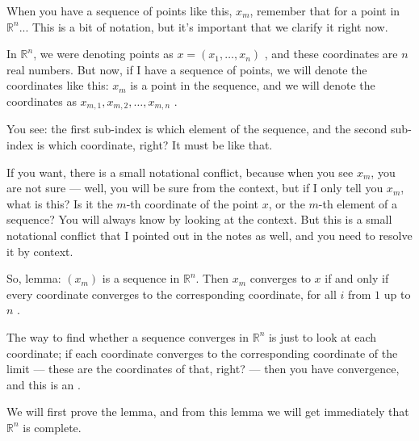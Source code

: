 \begin{speech}[01:04:02 - 01:05:47]
When you have a sequence of points like this, $x_m$, remember that for a point in $\mathbb{R}^n$... This is a bit of notation, but it's important that we clarify it right now.

In $\mathbb{R}^n$, we were denoting points as $x = (x_1, \dots, x_n)$ , and these coordinates are $n$ real numbers. But now, if I have a sequence of points, we will denote the coordinates like this: $x_m$ is a point in the sequence, and we will denote the coordinates as $x_{m, 1}, x_{m, 2}, \dots, x_{m, n}$ .

You see: the first sub-index is which element of the sequence, and the second sub-index is which coordinate, right? It must be like that.

If you want, there is a small notational conflict, because when you see $x_m$, you are not sure --- well, you will be sure from the context, but if I only tell you $x_m$, what is this? Is it the $m$-th coordinate of the point $x$, or the $m$-th element of a sequence? You will always know by looking at the context. But this is a small notational conflict that I pointed out in the notes as well, and you need to resolve it by context.
\end{speech}

\begin{speech}[01:05:47 - 01:06:45]
So, lemma: $(x_m)$ is a sequence in $\mathbb{R}^n$. Then $x_m$ converges to $x$  if and only if  every coordinate converges  to the corresponding coordinate, for all $i$ from $1$ up to $n$ .

The way to find whether a sequence converges in $\mathbb{R}^n$ is just to look at each coordinate; if each coordinate converges to the corresponding coordinate of the limit --- these are the coordinates of that, right?  --- then you have convergence, and this is an .

We will first prove the lemma, and from this lemma we will get immediately that $\mathbb{R}^n$ is complete.
\end{speech}

